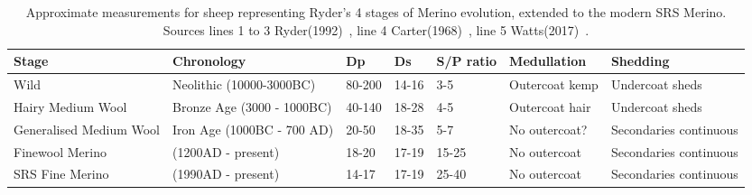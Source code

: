%

\begin{table}[h]
\centering
\caption{Approximate measurements for sheep representing Ryder's 4 stages of Merino evolution, extended to the modern SRS Merino. Sources lines 1 to 3 Ryder(1992)~\cite{ryde:92}, line 4 Carter(1968)~\cite{cart:68}, line 5 Watts(2017)~\cite{watt:17}.}
\label{tab:evolmeas}
\vspace{0.1in}
\begin{tabular}{|p{0.6in}|p{0.6in}|p{0.4in}|p{0.4in}|p{0.6in}|p{0.7in}|p{0.7in}|}  \hline
  Stage &  Chronology &  Dp & Ds & S/P ratio & Medullation & Shedding  \\ \hline
  Wild   & Neolithic (10000-3000BC) & 80-200 & 14-16 & 3-5 & Outercoat kemp & Undercoat sheds \\ \hline
  Hairy Medium Wool & Bronze Age (3000 - 1000BC) & 40-140 & 18-28 & 4-5 & Outercoat hair & Undercoat sheds \\ \hline
  Generalised Medium Wool & Iron Age (1000BC - 700 AD) & 20-50 & 18-35 & 5-7  & No outercoat? & Secondaries continuous \\  \hline
  Finewool Merino & (1200AD - present) & 18-20 & 17-19 & 15-25 & No outercoat & Secondaries continuous\\  \hline
  SRS Fine Merino & (1990AD - present) & 14-17 & 17-19 & 25-40 & No outercoat & Secondaries continuous \\ \hline
\end{tabular}
\end{table}

%
